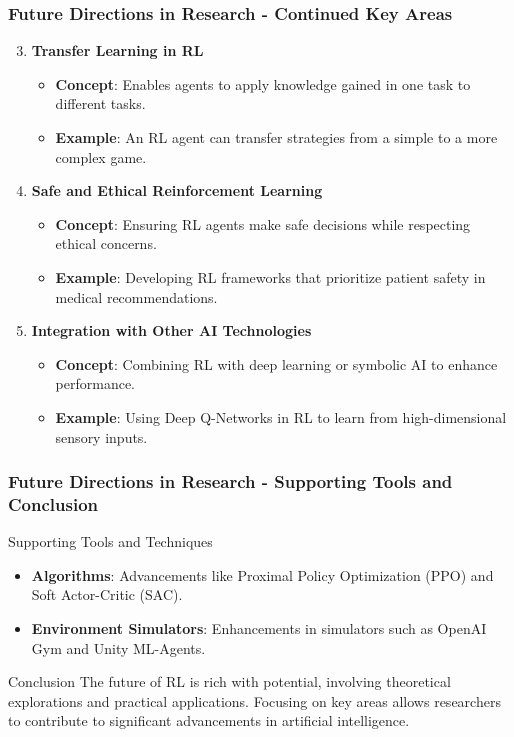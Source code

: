 \documentclass[aspectratio=169]{beamer}
\begin{document}
\begin{frame}[fragile]
  \frametitle{Future Directions in Research - Continued Key Areas}
  \begin{enumerate}
    \setcounter{enumi}{2}
    \item \textbf{Transfer Learning in RL}
      \begin{itemize}
        \item \textbf{Concept}: Enables agents to apply knowledge gained in one task to different tasks.
        \item \textbf{Example}: An RL agent can transfer strategies from a simple to a more complex game.
      \end{itemize}
    \item \textbf{Safe and Ethical Reinforcement Learning}
      \begin{itemize}
        \item \textbf{Concept}: Ensuring RL agents make safe decisions while respecting ethical concerns.
        \item \textbf{Example}: Developing RL frameworks that prioritize patient safety in medical recommendations.
      \end{itemize}
    \item \textbf{Integration with Other AI Technologies}
      \begin{itemize}
        \item \textbf{Concept}: Combining RL with deep learning or symbolic AI to enhance performance.
        \item \textbf{Example}: Using Deep Q-Networks in RL to learn from high-dimensional sensory inputs.
      \end{itemize}
  \end{enumerate}
\end{frame}

\begin{frame}[fragile]
  \frametitle{Future Directions in Research - Supporting Tools and Conclusion}
  \begin{block}{Supporting Tools and Techniques}
    \begin{itemize}
      \item \textbf{Algorithms}: Advancements like Proximal Policy Optimization (PPO) and Soft Actor-Critic (SAC).
      \item \textbf{Environment Simulators}: Enhancements in simulators such as OpenAI Gym and Unity ML-Agents.
    \end{itemize}
  \end{block}
  
  \begin{block}{Conclusion}
    The future of RL is rich with potential, involving theoretical explorations and practical applications. Focusing on key areas allows researchers to contribute to significant advancements in artificial intelligence.
  \end{block}
\end{frame}
\end{document}
